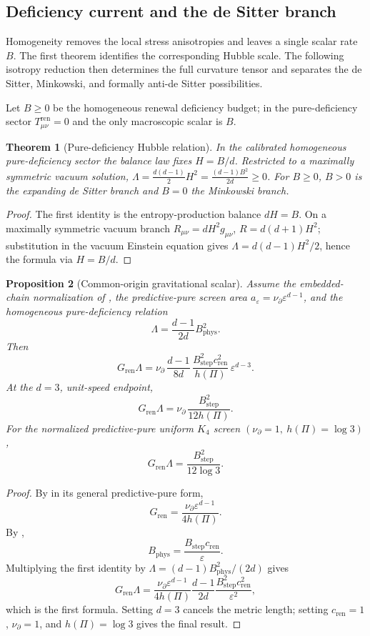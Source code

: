 \documentclass[11pt]{article}
\newtheorem{theorem}{Theorem}[section]
\newtheorem{proposition}[theorem]{Proposition}
\theoremstyle{definition}
\theoremstyle{remark}
\newcommand{\eps}{\varepsilon}
\newcommand{\Tren}{T^{\mathrm{ren}}}
\newcommand{\ren}{\mathrm{ren}}
\newcommand{\Gren}{G_{\mathrm{ren}}}
\newcommand{\Bstep}{B_{\mathrm{step}}}
\newcommand{\Bphys}{B_{\mathrm{phys}}}
\newcommand{\Npartial}{\nu_{\partial}}
\begin{document}
\subsection{Deficiency current and the de Sitter branch}

Homogeneity removes the local stress anisotropies and leaves a single scalar
rate $B$.  The first theorem identifies the corresponding Hubble scale.  The
following isotropy reduction then determines the full curvature tensor and
separates the de Sitter, Minkowski, and formally anti-de Sitter possibilities.

Let $B\ge0$ be the homogeneous renewal deficiency budget; in the pure-deficiency
sector $\Tren_{\mu\nu}=0$ and the only macroscopic scalar is $B$.

\begin{theorem}[Pure-deficiency Hubble relation]
\label{thm:lambda}
In the calibrated homogeneous pure-deficiency sector the balance law fixes
$H=B/d$.  Restricted to a maximally symmetric vacuum solution,
$\Lambda=\tfrac{d(d-1)}2H^2=\tfrac{(d-1)B^2}{2d}\ge0$.  For $B\ge0$, $B>0$ is the
expanding de Sitter branch and $B=0$ the Minkowski branch.
\end{theorem}

\begin{proof}
The first identity is the entropy-production balance $dH=B$.  On a maximally
symmetric vacuum branch $R_{\mu\nu}=dH^2g_{\mu\nu}$, $R=d(d+1)H^2$; substitution in
the vacuum Einstein equation gives $\Lambda=d(d-1)H^2/2$, hence the formula via
$H=B/d$.
\end{proof}


\begin{proposition}[Common-origin gravitational scalar]
\label{prop:common-origin-gravity-scalar}
Assume the embedded-chain normalization of
, the predictive-pure screen area
\(a_\eps=\Npartial\eps^{d-1}\), and the homogeneous pure-deficiency relation
\[
   \Lambda=\frac{d-1}{2d}\Bphys^2.
\]
Then
\[
 \boxed{\quad
 \Gren\Lambda
 =
 \Npartial\,\frac{d-1}{8d}\,
 \frac{\Bstep^2c_{\ren}^2}{h(\Pi)}\,
 \eps^{d-3}.
 \quad}
\]
At the \(d=3\), unit-speed endpoint,
\[
   \Gren\Lambda
   =\Npartial\,\frac{\Bstep^2}{12h(\Pi)}.
\]
For the normalized predictive-pure uniform \(K_4\) screen
\((\Npartial=1,\ h(\Pi)=\log3)\),
\[
 \boxed{\qquad
 \Gren\Lambda=\frac{\Bstep^2}{12\log3}.
 \qquad}
\]
\end{proposition}

\begin{proof}
By  in its general predictive-pure form,
\[
   \Gren=\frac{\Npartial\eps^{d-1}}{4h(\Pi)}.
\]
By ,
\[
   \Bphys=\frac{\Bstep c_{\ren}}{\eps}.
\]
Multiplying the first identity by
\(\Lambda=(d-1)\Bphys^2/(2d)\) gives
\[
 \Gren\Lambda
 =
 \frac{\Npartial\eps^{d-1}}{4h(\Pi)}
 \frac{d-1}{2d}
 \frac{\Bstep^2c_{\ren}^2}{\eps^2},
\]
which is the first formula.  Setting \(d=3\) cancels the metric length; setting
\(c_{\ren}=1\), \(\Npartial=1\), and \(h(\Pi)=\log3\) gives the final result.
\end{proof}
\end{document}

